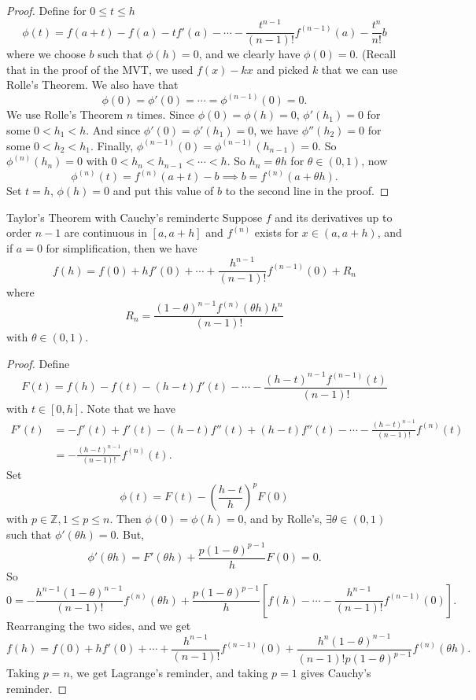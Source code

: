 \begin{proof}
    Define for \(0 \leq t \leq h\)
    \[
        \phi(t) = f(a + t) - f(a) - tf'(a) - \cdots -\frac{t^{n-1}}{(n-1)!}f^{(n-1)}(a) - \frac{t^n}{n!}b
    \]
    where we choose \(b\) such that \(\phi(h) = 0\), and we clearly have \(\phi(0) = 0\). (Recall that in the proof of the MVT, we used \(f(x) - kx\) and picked \(k\) that we can use Rolle's Theorem. We also have that
    \[\phi(0) = \phi'(0) = \cdots = \phi^{(n-1)}(0) = 0.\] We use Rolle's Theorem \(n\) times. Since \(\phi(0) = \phi(h) = 0\), \(\phi'(h_1) = 0\) for some \(0 < h_1 < h\). And since \(\phi'(0) = \phi'(h_1) = 0\), we have \(\phi''(h_2) = 0\) for some \(0 < h_2 < h_1\). Finally, \(\phi^{(n-1)}(0) = \phi^{(n-1)}(h_{n-1}) = 0\). So \(\phi^{(n)}(h_n)=0\) with \(0<h_n < h_{n-1} < \cdots < h\). So \(h_n = \theta h\) for \(\theta \in (0,1)\), now
    \[
        \phi^{(n)}(t) = f^{(n)}(a + t) - b \implies b = f^{(n)}(a + \theta h).
    \]
    Set \(t = h\), \(\phi(h) = 0\) and put this value of \(b\) to the second line in the proof.
\end{proof}
\begin{theorem}{Taylor's Theorem with Cauchy's reminder}{tc}
    Suppose \(f\) and its derivatives up to order \(n - 1\) are continuous in \([a, a + h]\) and \(f^{(n)}\) exists for \(x \in (a, a + h)\), and if \(a = 0\) for simplification, then we have
    \[
        f(h) = f(0) + hf'(0) + \cdots + \frac{h^{n-1}}{(n-1)!}f^{(n-1)}(0) + R_n
    \]
    where
    \[
        R_n = \frac{(1-\theta)^{n-1}f^{(n)}(\theta h)h^n}{(n-1)!}
    \]
    with \(\theta \in (0,1)\).
\end{theorem}
\begin{proof}
    Define
    \[
        F(t) = f(h) - f(t) - (h-t)f'(t) - \cdots - \frac{(h-t)^{n-1}f^{(n-1)}(t)}{(n-1)!}
    \]
    with \(t \in [0,h]\). Note that we have
    \begin{align*}
        F'(t) &= -f'(t) + f'(t) - (h-t)f''(t) + (h-t)f''(t) - \cdots -\frac{(h-t)^{n-1}}{(n-1)!}f^{(n)}(t)\\
        &= -\frac{(h-t)^{n-1}}{(n-1)!}f^{(n)}(t).
    \end{align*}
    Set
    \[
        \phi(t) = F(t) - (\frac{h - t}{h})^{p}F(0)
    \]
    with \(p \in \mathbb{Z}, 1 \leq p \leq n\). Then \(\phi(0) = \phi(h) = 0\), and by Rolle's, \(\exists \theta \in (0,1)\) such that \(\phi'(\theta h) = 0\). But,
    \[
        \phi'(\theta h) = F'(\theta h) + \frac{p(1-\theta)^{p-1}}{h}F(0) = 0.
    \]
    So
    \[
        0 = -\frac{h^{n-1}(1-\theta)^{n-1}}{(n-1)!}f^{(n)}(\theta h)+\frac{p(1-\theta)^{p-1}}{h}[f(h) - \cdots - \frac{h^{n-1}}{(n-1)!}f^{(n-1)}(0)].
    \]
    Rearranging the two sides, and we get
    \[
        f(h) = f(0) + hf'(0) + \cdots + \frac{h^{n-1}}{(n-1)!}f^{(n-1)}(0) + \frac{h^n(1-\theta)^{n-1}}{(n-1)!p(1-\theta)^{p-1}}f^{(n)}(\theta h).
    \]
    Taking \(p = n\), we get Lagrange's reminder, and taking \(p = 1\) gives Cauchy's reminder.
\end{proof}